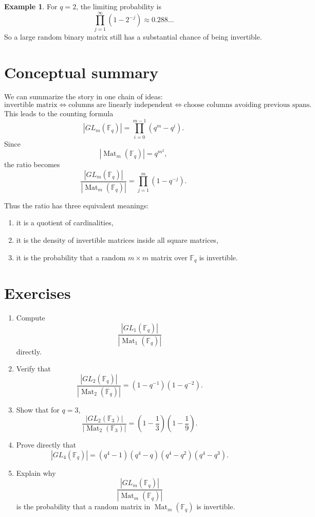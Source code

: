 \documentclass[11pt]{article}
\newcommand{\F}{\mathbb{F}}
\newcommand{\Mat}{\operatorname{Mat}}
\theoremstyle{definition}
\newtheorem{example}[definition]{Example}
\theoremstyle{plain}
\begin{document}
	\begin{example}
		For \(q=2\), the limiting probability is
		\[
		\prod_{j=1}^{\infty}(1-2^{-j})\approx 0.288\ldots
		\]
		So a large random binary matrix still has a substantial chance of being invertible.
	\end{example}
	
	\section{Conceptual summary}
	
	We can summarize the story in one chain of ideas:
	\[
	\text{invertible matrix}
	\Longleftrightarrow
	\text{columns are linearly independent}
	\Longleftrightarrow
	\text{choose columns avoiding previous spans}.
	\]
	This leads to the counting formula
	\[
	|GL_m(\F_q)|=\prod_{i=0}^{m-1}(q^m-q^i).
	\]
	Since
	\[
	|\Mat_m(\F_q)|=q^{m^2},
	\]
	the ratio becomes
	\[
	\frac{|GL_m(\F_q)|}{|\Mat_m(\F_q)|}
	=
	\prod_{j=1}^{m}(1-q^{-j}).
	\]
	
	Thus the ratio has three equivalent meanings:
	
	\begin{enumerate}[label=\textnormal{(\arabic*)}, leftmargin=2.5em]
		\item it is a quotient of cardinalities,
		\item it is the density of invertible matrices inside all square matrices,
		\item it is the probability that a random \(m\times m\) matrix over \(\F_q\) is invertible.
	\end{enumerate}
	
	\section*{Exercises}
	
	\begin{enumerate}[leftmargin=2em]
		\item Compute
		\[
		\frac{|GL_1(\F_q)|}{|\Mat_1(\F_q)|}
		\]
		directly.
		
		\item Verify that
		\[
		\frac{|GL_2(\F_q)|}{|\Mat_2(\F_q)|}
		=
		(1-q^{-1})(1-q^{-2}).
		\]
		
		\item Show that for \(q=3\),
		\[
		\frac{|GL_2(\F_3)|}{|\Mat_2(\F_3)|}
		=
		\left(1-\frac13\right)\left(1-\frac19\right).
		\]
		
		\item Prove directly that
		\[
		|GL_4(\F_q)|=(q^4-1)(q^4-q)(q^4-q^2)(q^4-q^3).
		\]
		
		\item Explain why
		\[
		\frac{|GL_m(\F_q)|}{|\Mat_m(\F_q)|}
		\]
		is the probability that a random matrix in \(\Mat_m(\F_q)\) is invertible.
	\end{enumerate}
\end{document}
